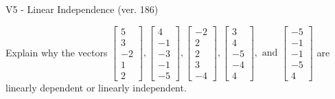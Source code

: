 \begin{exercise}
  \begin{exerciseTitle}V5 - Linear Independence (ver. 186)\end{exerciseTitle}
  \begin{exerciseStatement}
    Explain why the vectors \(\left[\begin{array}{r}
5 \\
3 \\
-2 \\
1 \\
2
\end{array}\right] , \left[\begin{array}{r}
4 \\
-1 \\
-3 \\
-1 \\
-5
\end{array}\right] , \left[\begin{array}{r}
-2 \\
2 \\
2 \\
3 \\
-4
\end{array}\right] , \left[\begin{array}{r}
3 \\
4 \\
-5 \\
-4 \\
4
\end{array}\right] , \text{ and } \left[\begin{array}{r}
-5 \\
-1 \\
-1 \\
-5 \\
4
\end{array}\right]\) are linearly dependent or linearly independent.	



\end{exerciseStatement}
\end{exercise}
